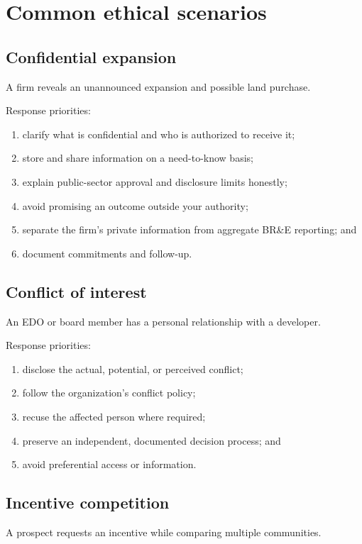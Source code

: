 \documentclass[11pt,letterpaper,oneside,openany]{book}
\begin{document}
\section[Common ethical scenarios]{Common ethical scenarios}
\subsection[Confidential expansion]{Confidential expansion}
A firm reveals an unannounced expansion and possible land purchase.


Response priorities:


\begin{enumerate}
\item clarify what is confidential and who is authorized to receive it;
\item store and share information on a need-to-know basis;
\item explain public-sector approval and disclosure limits honestly;
\item avoid promising an outcome outside your authority;
\item separate the firm's private information from aggregate BR\&E reporting; and
\item document commitments and follow-up.
\end{enumerate}


\subsection[Conflict of interest]{Conflict of interest}
An EDO or board member has a personal relationship with a developer.


Response priorities:


\begin{enumerate}
\item disclose the actual, potential, or perceived conflict;
\item follow the organization's conflict policy;
\item recuse the affected person where required;
\item preserve an independent, documented decision process; and
\item avoid preferential access or information.
\end{enumerate}


\subsection[Incentive competition]{Incentive competition}
A prospect requests an incentive while comparing multiple communities.
\end{document}
